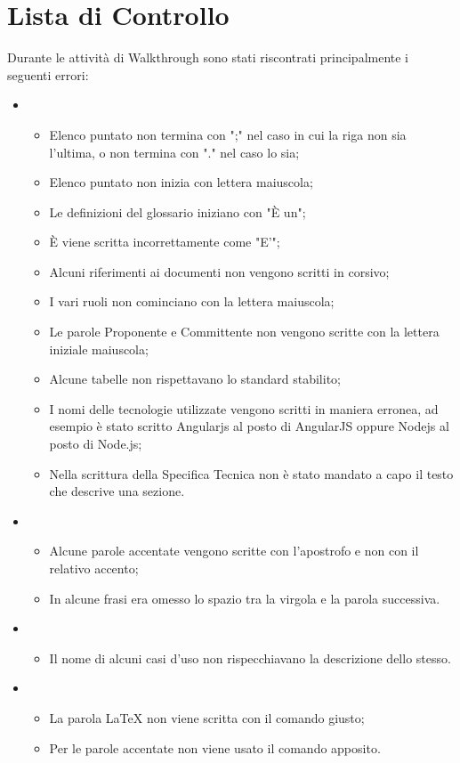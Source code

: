 \section{Lista di Controllo}
\label{}
Durante le attivit\`{a} di Walkthrough sono stati riscontrati principalmente i seguenti errori:\\
\begin{itemize}
\item {}
\begin{itemize}
\item Elenco puntato non termina con ";" nel caso in cui la riga non sia l'ultima, o non termina con "." nel caso lo sia;
\item Elenco puntato non inizia con lettera maiuscola;
\item Le definizioni del glossario iniziano con "È un";
\item È viene scritta incorrettamente come "E'";
\item Alcuni riferimenti ai documenti non vengono scritti in corsivo;
\item I vari ruoli non cominciano con la lettera maiuscola;
\item Le parole Proponente e Committente non vengono scritte con la lettera iniziale maiuscola;
\item Alcune tabelle non rispettavano lo standard stabilito;
\item I nomi delle tecnologie utilizzate vengono scritti in maniera erronea, ad esempio è stato scritto Angularjs al posto di AngularJS oppure Nodejs al posto di Node.js;
\item Nella scrittura della Specifica Tecnica non è stato mandato a capo il testo che descrive una sezione.\\
\end{itemize}
\item {}
\begin{itemize}
\item Alcune parole accentate vengono scritte con l'apostrofo e non con il relativo accento;
\item In alcune frasi era omesso lo spazio tra la virgola e la parola successiva.
\end{itemize}
\item {}
\begin{itemize}
\item Il nome di alcuni casi d'uso non rispecchiavano la descrizione dello stesso.
\end{itemize}
\item \grassetto{\LaTeX{}}
\begin{itemize}
\item La parola \LaTeX{} non viene scritta con il comando giusto;
\item Per le parole accentate non viene usato il comando apposito.
\end{itemize}
\end{itemize}



